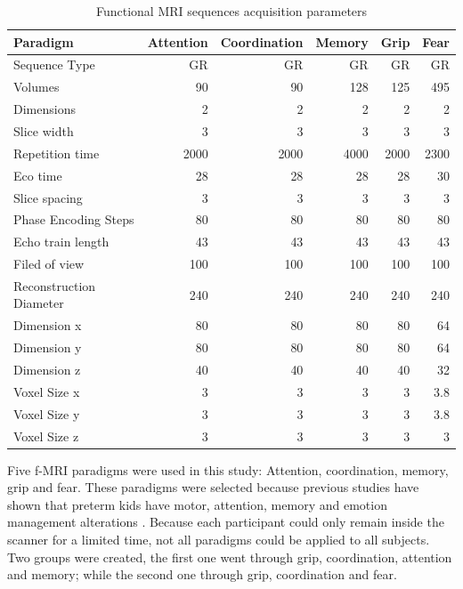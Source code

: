 \begin{table}
	\centering
	\footnotesize
		\begin{tabular}{lrrrrr}
	\toprule
	Paradigm &Attention	&Coordination	&Memory	&Grip &Fear\\ 
	\midrule
	Sequence Type	&GR	&GR	&GR	&GR &GR\\
	Volumes	&90	&90	&128	&125 &495\\
	Dimensions	&2	&2	&2	&2 &2\\
	Slice width	&3	&3	&3	&3 &3\\ \addlinespace
	Repetition time	&2000	&2000	&4000	&2000 &2300\\
	Eco time	&28	&28	&28	&28 &30\\
	Slice spacing	&3	&3	&3	&3 &3\\
	Phase Encoding Steps	&80	&80	&80	&80 &80\\
	Echo train length	&43	&43	&43	&43 &43\\
	Filed of view	&100	&100	&100	&100 &100\\
	Reconstruction	Diameter&240	&240	&240	&240 &240\\ \addlinespace
	Dimension x &80	&80 &80 &80 &64 \\
	Dimension y &80	&80 &80 &80 &64 \\
	Dimension z &40	&40 &40 &40 &32 \\ \addlinespace
	Voxel Size x	&3 &3 &3 &3 &3.8 \\
	Voxel Size y	&3 &3 &3 &3 &3.8 \\
	Voxel Size z	&3 &3 &3 &3 &3 \\
	\bottomrule
		\end{tabular}
	\caption{Functional MRI sequences acquisition parameters}
	\label{tab_fmri_params}
\end{table}

Five f-MRI paradigms were used in this study: Attention, coordination, memory, grip and fear. These paradigms were selected because previous studies have shown that preterm kids have motor, attention, memory and emotion management alterations \autocite{nosarti_neurodevelopmental_2010}. Because each participant could only remain inside the scanner for a limited time, not all paradigms could be applied to all subjects. Two groups were created, the first one went through grip, coordination, attention and memory; while the second one through grip, coordination and fear. 

